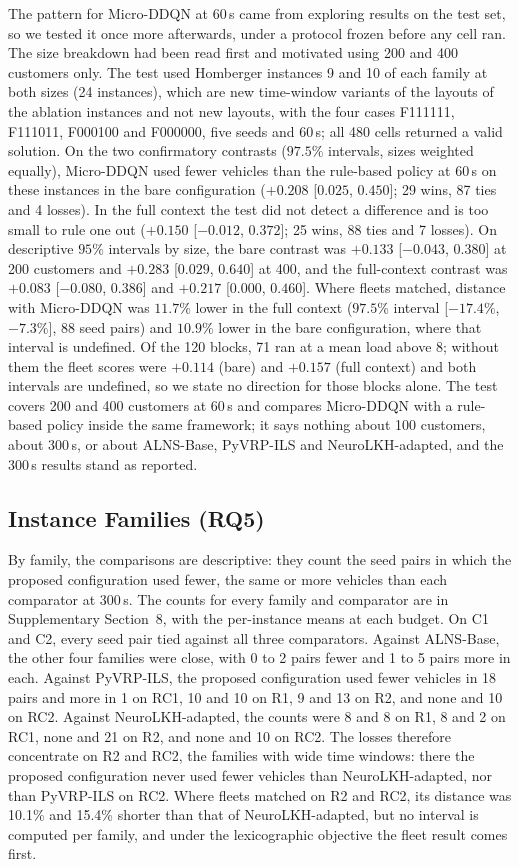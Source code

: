 \documentclass{ieeeaccess}
\begin{document}
The pattern for Micro-DDQN at 60\,s came from exploring results on the test set, so we tested it once more afterwards, under a protocol frozen before any cell ran. The size breakdown had been read first and motivated using 200 and 400 customers only. The test used Homberger instances 9 and 10 of each family at both sizes (24 instances), which are new time-window variants of the layouts of the ablation instances and not new layouts, with the four cases F111111, F111011, F000100 and F000000, five seeds and 60\,s; all 480 cells returned a valid solution. On the two confirmatory contrasts ($97.5\%$ intervals, sizes weighted equally), Micro-DDQN used fewer vehicles than the rule-based policy at 60\,s on these instances in the bare configuration ($+0.208$ [$0.025$, $0.450$]; 29 wins, 87 ties and 4 losses). In the full context the test did not detect a difference and is too small to rule one out ($+0.150$ [$-0.012$, $0.372$]; 25 wins, 88 ties and 7 losses). On descriptive $95\%$ intervals by size, the bare contrast was $+0.133$ [$-0.043$, $0.380$] at 200 customers and $+0.283$ [$0.029$, $0.640$] at 400, and the full-context contrast was $+0.083$ [$-0.080$, $0.386$] and $+0.217$ [$0.000$, $0.460$]. Where fleets matched, distance with Micro-DDQN was $11.7\%$ lower in the full context ($97.5\%$ interval [$-17.4\%$, $-7.3\%$], 88 seed pairs) and $10.9\%$ lower in the bare configuration, where that interval is undefined. Of the 120 blocks, 71 ran at a mean load above 8; without them the fleet scores were $+0.114$ (bare) and $+0.157$ (full context) and both intervals are undefined, so we state no direction for those blocks alone. The test covers 200 and 400 customers at 60\,s and compares Micro-DDQN with a rule-based policy inside the same framework; it says nothing about 100 customers, about 300\,s, or about ALNS-Base, PyVRP-ILS and NeuroLKH-adapted, and the 300\,s results stand as reported.

\subsection{Instance Families (RQ5)}
\label{sec:family_results}

By family, the comparisons are descriptive: they count the seed pairs in which the proposed configuration used fewer, the same or more vehicles than each comparator at 300\,s. The counts for every family and comparator are in Supplementary Section~8, with the per-instance means at each budget. On C1 and C2, every seed pair tied against all three comparators. Against ALNS-Base, the other four families were close, with 0 to 2 pairs fewer and 1 to 5 pairs more in each. Against PyVRP-ILS, the proposed configuration used fewer vehicles in 18 pairs and more in 1 on RC1, 10 and 10 on R1, 9 and 13 on R2, and none and 10 on RC2. Against NeuroLKH-adapted, the counts were 8 and 8 on R1, 8 and 2 on RC1, none and 21 on R2, and none and 10 on RC2. The losses therefore concentrate on R2 and RC2, the families with wide time windows: there the proposed configuration never used fewer vehicles than NeuroLKH-adapted, nor than PyVRP-ILS on RC2. Where fleets matched on R2 and RC2, its distance was 10.1\% and 15.4\% shorter than that of NeuroLKH-adapted, but no interval is computed per family, and under the lexicographic objective the fleet result comes first.
\end{document}
